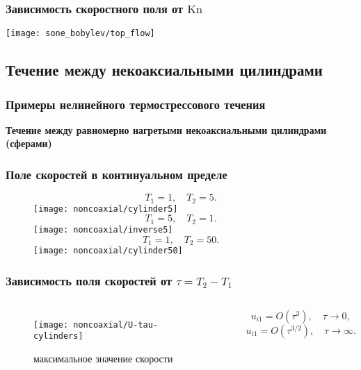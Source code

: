 \documentclass[mathserif]{beamer} %
\newcommand{\Kn}{\mathrm{Kn}}
\newcommand{\OO}[1]{O(#1)}
\begin{document}
\begin{frame}
    \frametitle{Зависимость скоростного поля от \(\Kn\)}
    \centering
    \texttt{[image: sone\_bobylev/top\_flow]}
\end{frame}

\subsection{Течение между некоаксиальными цилиндрами}

\begin{frame}[c]
    \frametitle{Примеры нелинейного термострессового течения}
    \centering
    \Large\bf
    Течение между равномерно нагретыми некоаксиальными цилиндрами (сферами)
\end{frame}

\begin{frame}
    \frametitle{Поле скоростей в континуальном пределе}
    \centering
    \begin{figure}
    \begin{overprint}
            \[ T_1 = 1, \quad T_2 = 5.\]
            \hspace{-1cm}
            \texttt{[image: noncoaxial/cylinder5]}
            \[ T_1 = 5, \quad T_2 = 1.\]
            \hspace{-1cm}
            \texttt{[image: noncoaxial/inverse5]}
            \[ T_1 = 1, \quad T_2 = 50.\]
            \hspace{-1cm}
            \texttt{[image: noncoaxial/cylinder50]}
    \end{overprint}
    \hspace{-.5cm}
    \end{figure}
\end{frame}

\begin{frame}
    \frametitle{Зависимость поля скоростей от \(\tau = T_2-T_1\)}
    \centering
    \begin{columns}
        \begin{figure}
            \texttt{[image: noncoaxial/U-tau-cylinders]}
            \vspace{-.5cm}\caption{максимальное значение скорости}
        \end{figure}
        \[ u_{i1} = \OO{\tau^3}, \quad \tau\to0, \]
        \[ u_{i1} = \OO{\tau^{3/2}}, \quad \tau\to\infty. \]
    \end{columns}
\end{frame}
\end{document}
